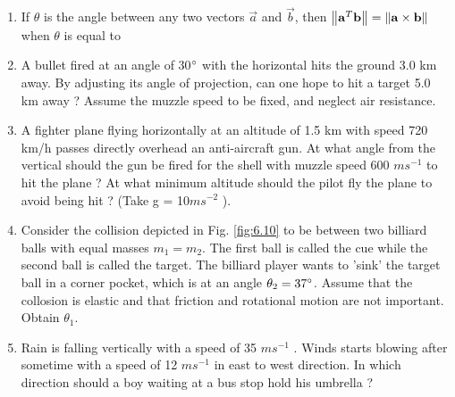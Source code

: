 \documentclass[journal,12pt,twocolumn]{IEEEtran}
\renewcommand\thesection{\arabic{section}}
\begin{document}
\begin{enumerate}[label=\thesection.\arabic*.,ref=\thesection.\theenumi]
\begin{enumerate}[itemsep = 2pt]
\end{enumerate}
\item If $\theta$ is the angle between any two vectors $\vec{a}$ and $\vec{b}$, then 
$\left\lVert\mathbf{a}^T\mathbf{b}\right\rVert = \left\lVert\mathbf{a} \times \mathbf{b}\right\rVert$ when $\theta$ is equal to 
\begin{enumerate}[itemsep = 2pt]
\end{enumerate}
\item A bullet fired at an angle of 30$\degree$ with the horizontal hits the ground 3.0 km away. By adjusting its angle of projection, can one hope to hit a target 5.0 km away ? Assume the muzzle speed to be fixed, and neglect air resistance.
\item  A fighter plane flying horizontally at an altitude of 1.5 km with speed 720 km/h passes directly overhead an anti-aircraft gun. At what angle from the vertical should the gun be fired for the shell with muzzle speed 600 $m s^{-1}$ to hit the plane ? 
At what minimum  altitude should the pilot fly the plane to avoid being hit ? (Take g = 10$ m s^{-2}$
).
\item Consider the collision depicted in Fig. \ref{fig:6.10} to be between two billiard balls with equal masses $m_1= m_2$.  The first ball is called the cue while the second ball is called the target. The billiard player wants to 'sink' the target ball in a corner pocket, which is at an angle $\theta_2=37\degree$.  Assume that the collosion
is elastic and that friction and rotational motion are not important. Obtain $\theta_1$.
\item Rain is falling vertically with a speed of 35 $m s^{-1}$
. Winds starts blowing after sometime with a speed of 12 $m s^{-1}$ in
east to west direction. In which direction should a boy waiting at a bus stop hold his umbrella ?
%
\\
\solution 
%


\end{enumerate}
\end{document}
